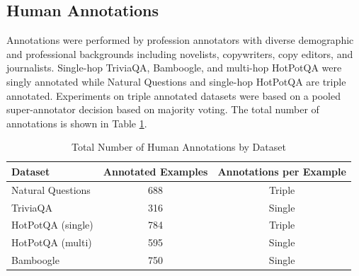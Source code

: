 \documentclass[11pt]{article}
\begin{document}
\subsection{Human Annotations \label{sec:appendix_annotation}}
Annotations were performed by profession annotators with diverse demographic and professional backgrounds including novelists, copywriters, copy editors, and journalists. Single-hop TriviaQA, Bamboogle, and multi-hop HotPotQA were singly annotated while Natural Questions and single-hop HotPotQA are triple annotated. Experiments on triple annotated datasets were based on a pooled super-annotator decision based on majority voting. The total number of annotations is shown in Table \ref{tab:num_annotations}.

\begin{table}[ht]
\centering
\caption{Total Number of Human Annotations by Dataset \label{tab:num_annotations}}
\begin{tabular}{lcc}
\toprule
\textbf{Dataset} & \textbf{Annotated Examples} & \textbf{Annotations per Example}\\ \midrule
Natural Questions & 688 & Triple \\
TriviaQA & 316  & Single\\
HotPotQA (single) & 784 & Triple \\
HotPotQA (multi) & 595  & Single\\
Bamboogle & 750 & Single\\ \bottomrule
\end{tabular}
\end{table}
\end{document}
